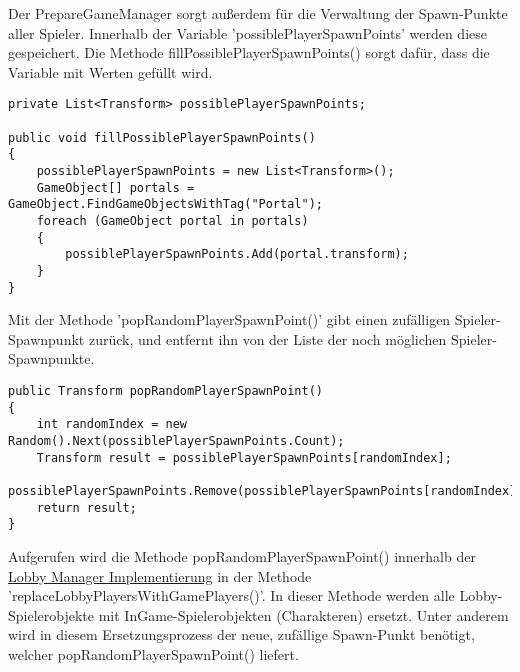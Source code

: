 Der PrepareGameManager sorgt außerdem für die Verwaltung der Spawn-Punkte aller Spieler. Innerhalb der Variable 'possiblePlayerSpawnPoints' werden diese gespeichert. Die Methode fillPossiblePlayerSpawnPoints() sorgt dafür, dass die Variable mit Werten gefüllt wird.

\begin{lstlisting}[caption= PrepareGameManager.cs fillPossiblePlayerSpawnPoints()]
private List<Transform> possiblePlayerSpawnPoints;

public void fillPossiblePlayerSpawnPoints()
{
	possiblePlayerSpawnPoints = new List<Transform>();
	GameObject[] portals = GameObject.FindGameObjectsWithTag("Portal");
	foreach (GameObject portal in portals)
	{
		possiblePlayerSpawnPoints.Add(portal.transform);
	}
}
\end{lstlisting}

Mit der Methode 'popRandomPlayerSpawnPoint()' gibt einen zufälligen Spieler-Spawnpunkt zurück, und entfernt ihn von der Liste der noch möglichen Spieler-Spawnpunkte.

\begin{lstlisting}[caption= PrepareGameManager.cs popRandomPlayerSpawnPoint()]
public Transform popRandomPlayerSpawnPoint()
{
	int randomIndex = new Random().Next(possiblePlayerSpawnPoints.Count);
	Transform result = possiblePlayerSpawnPoints[randomIndex];
	possiblePlayerSpawnPoints.Remove(possiblePlayerSpawnPoints[randomIndex]);
	return result;
}
\end{lstlisting}

Aufgerufen wird die Methode popRandomPlayerSpawnPoint() innerhalb der \hyperref[Lobby Manager Implementierung]{Lobby Manager Implementierung} in der Methode 'replaceLobbyPlayersWithGamePlayers()'. In dieser Methode werden alle Lobby-Spielerobjekte mit InGame-Spielerobjekten (Charakteren) ersetzt. Unter anderem wird in diesem Ersetzungsprozess der neue, zufällige Spawn-Punkt benötigt, welcher popRandomPlayerSpawnPoint() liefert.

